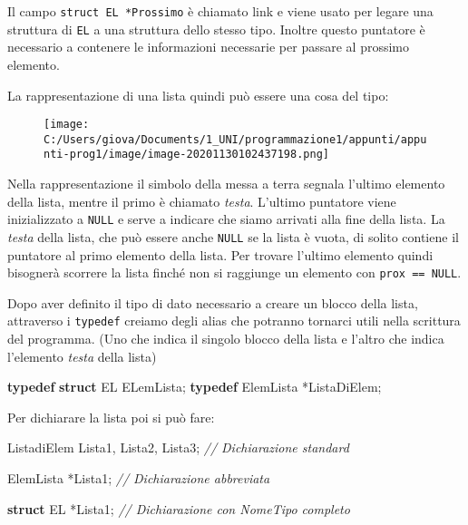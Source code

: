 \documentclass[
]{article}
\newenvironment{Shaded}{}{}
\newcommand{\CommentTok}[1]{\textcolor[rgb]{0.38,0.63,0.69}{\textit{#1}}}
\newcommand{\KeywordTok}[1]{\textcolor[rgb]{0.00,0.44,0.13}{\textbf{#1}}}
\newcommand{\NormalTok}[1]{#1}
\begin{document}
Il campo \texttt{struct\ EL\ *Prossimo} è chiamato link e viene usato
per legare una struttura di \texttt{EL} a una struttura dello stesso
tipo. Inoltre questo puntatore è necessario a contenere le informazioni
necessarie per passare al prossimo elemento.

La rappresentazione di una lista quindi può essere una cosa del tipo:

\begin{figure}
\centering
\texttt{[image: C:/Users/giova/Documents/1\_UNI/programmazione1/appunti/appunti-prog1/image/image-20201130102437198.png]}
\caption{}
\end{figure}

Nella rappresentazione il simbolo della messa a terra segnala l'ultimo
elemento della lista, mentre il primo è chiamato \emph{testa}. L'ultimo
puntatore viene inizializzato a \texttt{NULL} e serve a indicare che
siamo arrivati alla fine della lista. La \emph{testa} della lista, che
può essere anche \texttt{NULL} se la lista è vuota, di solito contiene
il puntatore al primo elemento della lista. Per trovare l'ultimo
elemento quindi bisognerà scorrere la lista finché non si raggiunge un
elemento con \texttt{prox\ ==\ NULL}.

Dopo aver definito il tipo di dato necessario a creare un blocco della
lista, attraverso i \texttt{typedef} creiamo degli alias che potranno
tornarci utili nella scrittura del programma. (Uno che indica il singolo
blocco della lista e l'altro che indica l'elemento \emph{testa} della
lista)

\begin{Shaded}
\begin{Highlighting}[]
\KeywordTok{typedef} \KeywordTok{struct}\NormalTok{ EL ELemLista;}
\KeywordTok{typedef}\NormalTok{ ElemLista *ListaDiElem; }
\end{Highlighting}
\end{Shaded}

Per dichiarare la lista poi si può fare:

\begin{Shaded}
\begin{Highlighting}[]
\NormalTok{ListadiElem Lista1, Lista2, Lista3; }\CommentTok{// Dichiarazione standard}

\NormalTok{ElemLista *Lista1; 					}\CommentTok{// Dichiarazione abbreviata}

\KeywordTok{struct}\NormalTok{ EL *Lista1; 					}\CommentTok{// Dichiarazione con NomeTipo completo}
\end{Highlighting}
\end{Shaded}
\end{document}

